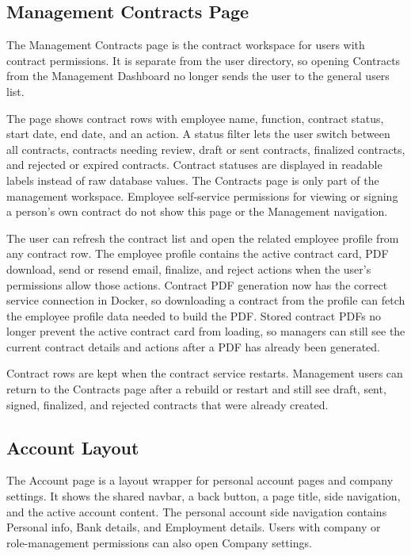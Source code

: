 \documentclass[11pt]{article}
\begin{document}
\subsection{Management Contracts Page}

The Management Contracts page is the contract workspace for users with contract permissions. It is separate from the user directory, so opening Contracts from the Management Dashboard no longer sends the user to the general users list.

The page shows contract rows with employee name, function, contract status, start date, end date, and an action. A status filter lets the user switch between all contracts, contracts needing review, draft or sent contracts, finalized contracts, and rejected or expired contracts. Contract statuses are displayed in readable labels instead of raw database values. The Contracts page is only part of the management workspace. Employee self-service permissions for viewing or signing a person's own contract do not show this page or the Management navigation.

The user can refresh the contract list and open the related employee profile from any contract row. The employee profile contains the active contract card, PDF download, send or resend email, finalize, and reject actions when the user's permissions allow those actions. Contract PDF generation now has the correct service connection in Docker, so downloading a contract from the profile can fetch the employee profile data needed to build the PDF. Stored contract PDFs no longer prevent the active contract card from loading, so managers can still see the current contract details and actions after a PDF has already been generated.

Contract rows are kept when the contract service restarts. Management users can return to the Contracts page after a rebuild or restart and still see draft, sent, signed, finalized, and rejected contracts that were already created.
\subsection{Account Layout}

The Account page is a layout wrapper for personal account pages and company settings. It shows the shared navbar, a back button, a page title, side navigation, and the active account content. The personal account side navigation contains Personal info, Bank details, and Employment details. Users with company or role-management permissions can also open Company settings.
\end{document}
